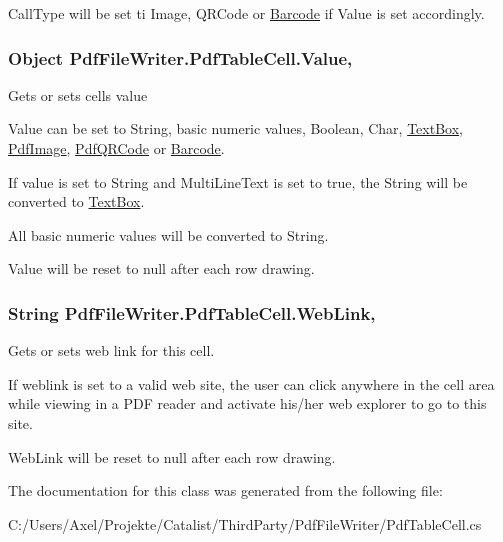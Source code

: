 Call\+Type will be set ti Image, Q\+R\+Code or \hyperlink{class_pdf_file_writer_1_1_barcode}{Barcode} if Value is set accordingly. 
\subsubsection[{\texorpdfstring{Value}{Value}}]{\setlength{\rightskip}{0pt plus 5cm}Object Pdf\+File\+Writer.\+Pdf\+Table\+Cell.\+Value\hspace{0.3cm}{\ttfamily [get]}, {\ttfamily [set]}}\hypertarget{class_pdf_file_writer_1_1_pdf_table_cell_a00060b4a3d84008c9ff254240c1f5ce3}{}\label{class_pdf_file_writer_1_1_pdf_table_cell_a00060b4a3d84008c9ff254240c1f5ce3}


Gets or sets cell\textquotesingle{}s value 

Value can be set to String, basic numeric values, Boolean, Char, \hyperlink{class_pdf_file_writer_1_1_text_box}{Text\+Box}, \hyperlink{class_pdf_file_writer_1_1_pdf_image}{Pdf\+Image}, \hyperlink{class_pdf_file_writer_1_1_pdf_q_r_code}{Pdf\+Q\+R\+Code} or \hyperlink{class_pdf_file_writer_1_1_barcode}{Barcode}. 

If value is set to String and Multi\+Line\+Text is set to true, the String will be converted to \hyperlink{class_pdf_file_writer_1_1_text_box}{Text\+Box}. 

All basic numeric values will be converted to String. 

Value will be reset to null after each row drawing. 
\subsubsection[{\texorpdfstring{Web\+Link}{WebLink}}]{\setlength{\rightskip}{0pt plus 5cm}String Pdf\+File\+Writer.\+Pdf\+Table\+Cell.\+Web\+Link\hspace{0.3cm}{\ttfamily [get]}, {\ttfamily [set]}}\hypertarget{class_pdf_file_writer_1_1_pdf_table_cell_a8c12f3569a690ac6c1934311fcc9cb96}{}\label{class_pdf_file_writer_1_1_pdf_table_cell_a8c12f3569a690ac6c1934311fcc9cb96}


Gets or sets web link for this cell. 

If weblink is set to a valid web site, the user can click anywhere in the cell area while viewing in a P\+DF reader and activate his/her web explorer to go to this site. 

Web\+Link will be reset to null after each row drawing. 

The documentation for this class was generated from the following file\+:\begin{DoxyCompactItemize}
\item 
C\+:/\+Users/\+Axel/\+Projekte/\+Catalist/\+Third\+Party/\+Pdf\+File\+Writer/Pdf\+Table\+Cell.\+cs\end{DoxyCompactItemize}
